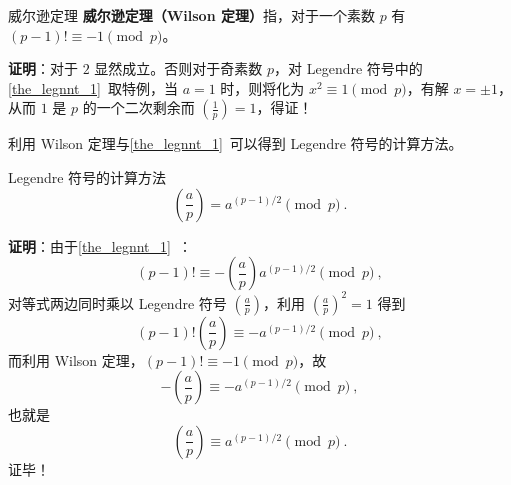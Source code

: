 
\begin{theorem}{威尔逊定理}
\textbf{威尔逊定理（Wilson 定理）}指，对于一个素数 $p$ 有 $(p-1)! \equiv -1 \pmod p$。
\end{theorem}
\textbf{证明}：对于 $2$ 显然成立。否则对于奇素数 $p$，对 Legendre 符号中的\autoref{the_legnnt_1}~取特例，当 $a=1$ 时，则将化为 $x^2 \equiv 1 \pmod p$，有解 $x = \pm 1$，从而 $1$ 是 $p$ 的一个二次剩余而 $\left(\frac 1p\right)=1$，得证！

利用 Wilson 定理与\autoref{the_legnnt_1}~可以得到 Legendre 符号的计算方法。
\begin{theorem}{Legendre 符号的计算方法}\label{the_wilsth_1}
\begin{equation}
\left(\frac ap\right) = a^{(p-1)/2} \pmod p ~.
\end{equation}
\end{theorem}
\textbf{证明}：由于\autoref{the_legnnt_1}~：
\begin{equation}
(p-1)! \equiv -\left(\frac ap\right) a^{(p-1)/2} \pmod p ~,
\end{equation}
对等式两边同时乘以 Legendre 符号 $\left(\frac ap\right)$，利用 $\left(\frac ap\right)^2 = 1$ 得到
\begin{equation}
(p-1)!\left(\frac ap\right) \equiv - a^{(p-1)/2} \pmod p ~,
\end{equation}
而利用 Wilson 定理，$(p-1)! \equiv -1 \pmod p$，故
\begin{equation}
-\left(\frac ap\right) \equiv - a^{(p-1)/2} \pmod p ~,
\end{equation}
也就是
\begin{equation}
\left(\frac ap\right) \equiv a^{(p-1)/2} \pmod p ~.
\end{equation}
证毕！